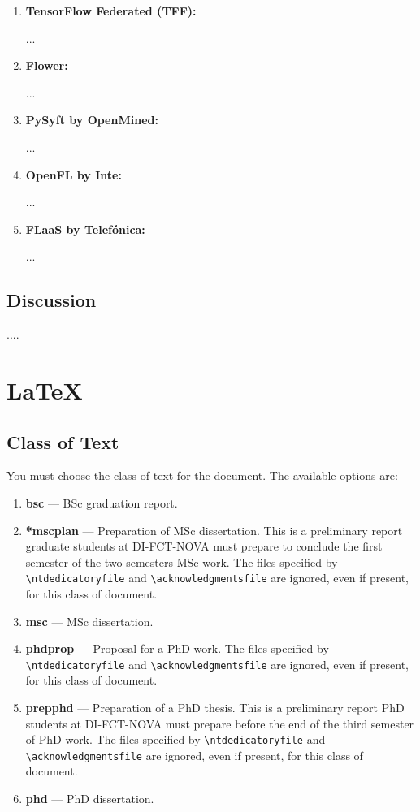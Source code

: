 \begin{enumerate}
	\item \textbf{TensorFlow Federated (TFF):}
	
	...
	\item \textbf{Flower:}
	 
	...
	\item \textbf{PySyft by OpenMined:}
	 
	...
	\item \textbf{OpenFL by Inte:}
	 
	...
	\item \textbf{FLaaS by Telefónica:}
	
	...
	
\end{enumerate}


\subsection{Discussion}
\label{sec:discussion_fl_apps_frameworks}

....

\section{LaTeX}

\subsection{Class of Text}
\label{sub:class_of_text}

You must choose the class of text for the document. The available options are:

\begin{enumerate}
  \item \textbf{bsc} --- BSc graduation report.
  \item \textbf{*mscplan} --- Preparation of MSc dissertation. This is a preliminary report graduate students at DI-FCT-NOVA must prepare to conclude the first semester of the two-semesters MSc work. The files specified by \verb!\ntdedicatoryfile! and \verb!\acknowledgmentsfile! are ignored, even if present, for this class of document.
  \item \textbf{msc} --- MSc dissertation.
  \item \textbf{phdprop} ---  Proposal for a PhD work. The files specified by \verb!\ntdedicatoryfile! and \verb!\acknowledgmentsfile! are ignored, even if present, for this class of document.
  \item \textbf{prepphd} ---  Preparation of a PhD thesis. This is a preliminary report PhD students at DI-FCT-NOVA must prepare before the end of the third semester of PhD work. The files specified by \verb!\ntdedicatoryfile! and \verb!\acknowledgmentsfile! are ignored, even if present, for this class of document.
  \item \textbf{phd} --- PhD dissertation.
\end{enumerate}

